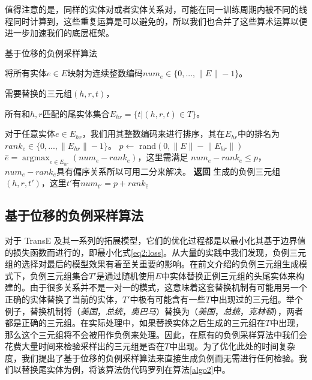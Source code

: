 值得注意的是，同样的实体对或者实体关系对，可能在同一训练周期内被不同的线程同时计算到，这些重复运算是可以避免的，所以我们也合并了这些算术运算以便进一步加速我们的底层框架。



\begin{algorithm}[t]
  \caption{基于位移的负例采样算法}
  \label{algo2}
  \begin{algorithmic}[1]
      \Ensure 将所有实体$e \in E$映射为连续整数编码$num_e \in \{0, ..., \lVert E \rVert  - 1\}$。
        \Require 

        需要替换的三元组$(h, r, t)$，

        所有和$h, r$匹配的尾实体集合$E_{hr} = \{t|(h,r,t)\in T\}$。

        对于任意实体$e \in E_{hr}$，我们用其整数编码来进行排序，其在$E_{hr}$中的排名为$rank_e \in \{0, ..., \lVert E_{hr} \rVert  - 1\}$。
        \State $p \leftarrow $ rand$(0, \lVert E \rVert - \lVert E_{hr} \rVert)$
        \State $\hat{e} = \mathop{\arg\max}_{e \in E_{hr}} (num_{e}-rank_{e})$，这里需满足 $num_{e}-rank_{e} \leq p$，$num_{e}-rank_{e}$具有偏序关系所以可用二分来解决。
        \State \textbf{返回} 生成的负例三元组$(h, r, t')$，这里$t'$有$num_{t'} = p + rank_{\hat{e}}$
  \end{algorithmic}
\end{algorithm}


\subsection{基于位移的负例采样算法}

对于 TransE 及其一系列的拓展模型，它们的优化过程都是以最小化其基于边界值的损失函数而进行的，即最小化式\ref{eq2:loss}。从大量的实践中我们发现，负例三元组的选择对最后的模型效果有着至关重要的影响。在前文介绍的负例三元组生成模式下，负例三元组集合$T'$是通过随机使用$E$中实体替换正例三元组的头尾实体来构建的。由于很多关系并不是一对一的模式，这意味着这套替换机制有可能用另一个正确的实体替换了当前的实体，$T'$中极有可能含有一些$T$中出现过的三元组。举个例子，替换机制将（\emph{美国}，\emph{总统}，\emph{奥巴马}）替换为（\emph{美国}，\emph{总统}，\emph{克林顿}），两者都是正确的三元组。在实际处理中，如果替换实体之后生成的三元组在$T$中出现，那么这个三元组将不会被用作负例来处理。因此，在原有的负例采样算法中我们会花费大量时间来检验采样出的三元组是否在$T$中出现。为了优化此处的时间复杂度，我们提出了基于位移的负例采样算法来直接生成负例而无需进行任何检验。我们以替换尾实体为例，将该算法伪代码罗列在算法\ref{algo2}中。

